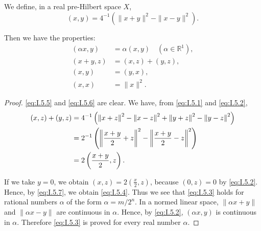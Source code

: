 \begin{theorem}\label{thm:I.5.Theorem.1} We define, in a real pre-Hilbert space $X$, 
\begin{equation}\label{eq:I.5.2}
(x, y) = 4 ^{-1} (\| x + y \| ^{2}- \| x- y \| ^{2}).
\end{equation}
\end{theorem}

Then we have the properties: 
\begin{align}
(\alpha x, y)& = \alpha (x, y) \quad (\alpha \in \mathbb{R}^{1}), \label{eq:I.5.3} \\
(x + y, z)& = (x, z) + (y, z), \label{eq:I.5.4} \\
(x, y)& = (y, x), \label{eq:I.5.5} \\
(x, x)& = \| x \| ^{2}. \label{eq:I.5.6}
\end{align}

\begin{proof}
 \eqref{eq:I.5.5} and \eqref{eq:I.5.6} are clear. We have, from \eqref{eq:I.5.1} and \eqref{eq:I.5.2}, 
\begin{align}
(x, z) + (y, z)& = 4 ^{-1} \left(\left\| x + z \right\| ^{2}- \left\| x- z \right\| ^{2} + \left\| y + z \right\| ^{2}- \left\| y- z \right\| ^{2}\right) \notag \\
&= 2 ^{-1} \left(\left\| \frac {x + y}{2} + z \right\| ^{2}- \left\| \frac {x + y}{2}- z \right\| ^{2}\right) \notag
\\
&= 2 \left(\frac {x + y}{2}, z\right).  \label{eq:I.5.7}
\end{align}

If we take $y = 0$, we obtain $(x, z) = 2\left(\frac{x}{2}, z\right)$, because $(0, z) = 0$ by \eqref{eq:I.5.2}. Hence, by \eqref{eq:I.5.7}, we obtain \eqref{eq:I.5.4}. Thus we see that \eqref{eq:I.5.3} holds for rational numbers $\alpha$ of the form $\alpha = m / 2^n$. In a normed linear space, $\|\alpha x + y\|$ and $\|\alpha x- y\|$ are continuous in $\alpha$. Hence, by \eqref{eq:I.5.2}, $(\alpha x, y)$ is continuous in $\alpha$. Therefore \eqref{eq:I.5.3} is proved for every real number $\alpha$. 
\end{proof}

